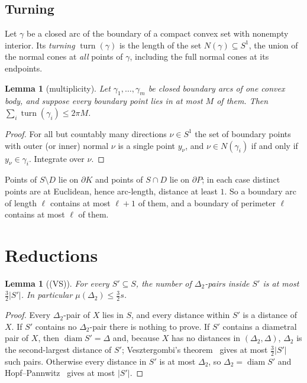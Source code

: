 \documentclass[11pt]{amsart}
\newtheorem{lemma}[theorem]{Lemma}
\theoremstyle{definition}
\theoremstyle{remark}
\newcommand{\Dt}{\Delta_2}
\newcommand{\mult}{\mu}
\newcommand{\turn}{\operatorname{turn}}
\begin{document}
\subsection*{Turning}
Let $\gamma$ be a closed arc of the boundary of a compact convex set with nonempty interior. Its \emph{turning} $\turn(\gamma)$ is the length of the set $N(\gamma)\subseteq S^1$, the union of the normal cones at \emph{all} points of $\gamma$, including the full normal cones at its endpoints.

\begin{lemma}[multiplicity]\label{lem:multiplicity}
Let $\gamma_1,\dots,\gamma_m$ be closed boundary arcs of one convex body, and suppose every boundary point lies in at most $M$ of them. Then $\sum_i\turn(\gamma_i)\le 2\pi M$.
\end{lemma}
\begin{proof}
For all but countably many directions $\nu\in S^1$ the set of boundary points with outer (or inner) normal $\nu$ is a single point $y_\nu$, and $\nu\in N(\gamma_i)$ if and only if $y_\nu\in\gamma_i$. Integrate over $\nu$.
\end{proof}

Points of $S\setminus D$ lie on $\partial K$ and points of $S\cap D$ lie on $\partial P$; in each case distinct points are at Euclidean, hence arc-length, distance at least $1$. So a boundary arc of length $\ell$ contains at most $\ell+1$ of them, and a boundary of perimeter $\ell$ contains at most $\ell$ of them.

\section{Reductions}\label{sec:reductions}

\begin{lemma}[(VS)]\label{lem:VS}
For every $S'\subseteq S$, the number of $\Dt$-pairs inside $S'$ is at most $\frac32|S'|$. In particular $\mult(\Dt)\le\frac32 s$.
\end{lemma}
\begin{proof}
Every $\Dt$-pair of $X$ lies in $S$, and every distance within $S'$ is a distance of $X$. If $S'$ contains no $\Dt$-pair there is nothing to prove. If $S'$ contains a diametral pair of $X$, then $\operatorname{diam}S'=\Delta$ and, because $X$ has no distances in $(\Dt,\Delta)$, $\Dt$ is the second-largest distance of $S'$; Vesztergombi's theorem~\cite{Ve87} gives at most $\frac32|S'|$ such pairs. Otherwise every distance in $S'$ is at most $\Dt$, so $\Dt=\operatorname{diam}S'$ and Hopf--Pannwitz~\cite{HP34} gives at most $|S'|$.
\end{proof}
\end{document}
